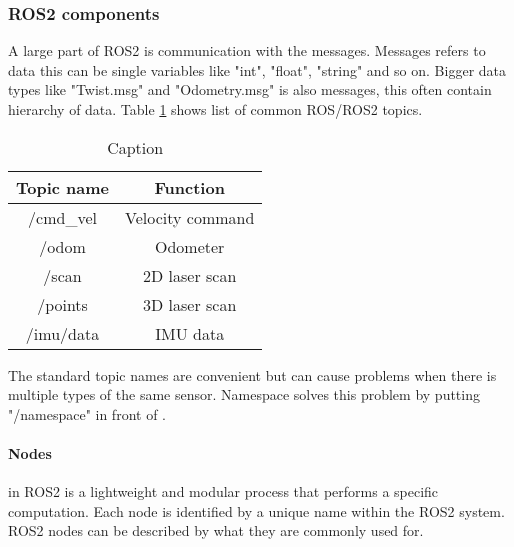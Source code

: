 \subsubsection{ROS2 components} 

A large part of ROS2 is communication with the messages. Messages refers to data this can be single variables like "int", "float", "string" and so on. Bigger data types like "Twist.msg" and "Odometry.msg" is also messages, this often contain hierarchy of data. 
Table \ref{tab:ROS2_topics} shows list of common ROS/ROS2 topics.
\begin{table}[H]
    \centering
    \begin{tabular}{c|c}
       Topic name       & Function          \\ \hline
        /cmd\_vel       & Velocity command  \\
        /odom           & Odometer          \\
        /scan           & 2D laser scan     \\
        /points         & 3D laser scan     \\        
        /imu/data       & IMU data          \\
    \end{tabular}
    \caption{Caption}
    \label{tab:ROS2_topics}
\end{table}

The standard topic names are convenient but can cause problems when there is multiple types of the same sensor. Namespace solves this problem by putting "/namespace" in front of .  

\paragraph{Nodes} in ROS2 is a lightweight and modular process that performs a specific computation. Each node is identified by a unique name within the ROS2 system. 
ROS2 nodes can be described by what they are commonly used for. 

